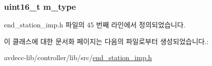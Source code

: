 \subsubsection[{\texorpdfstring{m\+\_\+type}{m_type}}]{\setlength{\rightskip}{0pt plus 5cm}uint16\+\_\+t m\+\_\+type}\hypertarget{classavdecc__lib_1_1background__read__request_ac20aab1609ec880fd9d4020e7dd26b5d}{}\label{classavdecc__lib_1_1background__read__request_ac20aab1609ec880fd9d4020e7dd26b5d}


end\+\_\+station\+\_\+imp.\+h 파일의 45 번째 라인에서 정의되었습니다.



이 클래스에 대한 문서화 페이지는 다음의 파일로부터 생성되었습니다.\+:\begin{DoxyCompactItemize}
\item 
avdecc-\/lib/controller/lib/src/\hyperlink{end__station__imp_8h}{end\+\_\+station\+\_\+imp.\+h}\end{DoxyCompactItemize}

